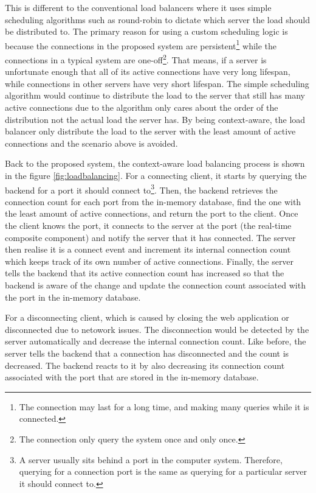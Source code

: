 \documentclass[../thesis.tex]{subfiles}
\begin{document}
This is different to the conventional load balancers where it uses simple scheduling algorithms such as round-robin to dictate which server the load should be distributed to. The primary reason for using a custom scheduling logic is because the connections in the proposed system are persistent\footnote{The connection may last for a long time, and making many queries while it is connected.} while the connections in a typical system are one-off\footnote{The connection only query the system once and only once.}. That means, if a server is unfortunate enough that all of its active connections have very long lifespan, while connections in other servers have very short lifespan. The simple scheduling algorithm would continue to distribute the load to the server that still has many active connections due to the algorithm only cares about the order of the distribution not the actual load the server has. By being context-aware, the load balancer only distribute the load to the server with the least amount of active connections and the scenario above is avoided. 

Back to the proposed system, the context-aware load balancing process is shown in the figure \ref{fig:loadbalancing}. For a connecting client, it starts by querying the backend for a port it should connect to\footnote{A server usually sits behind a port in the computer system. Therefore, querying for a connection port is the same as querying for a particular server it should connect to.}. Then, the backend retrieves the connection count for each port from the in-memory database, find the one with the least amount of active connections, and return the port to the client. Once the client knows the port, it connects to the server at the port (the real-time composite component) and notify the server that it has connected. The server then realise it is a connect event and increment its internal connection count which keeps track of its own number of active connections. Finally, the server tells the backend that its active connection count has increased so that the backend is aware of the change and update the connection count associated with the port in the in-memory database. 

For a disconnecting client, which is caused by closing the web application or disconnected due to netowork issues. The disconnection would be detected by the server automatically and decrease the internal connection count. Like before, the server tells the backend that a connection has disconnected and the count is decreased. The backend reacts to it by also decreasing its connection count associated with the port that are stored in the in-memory database. 
\end{document}
